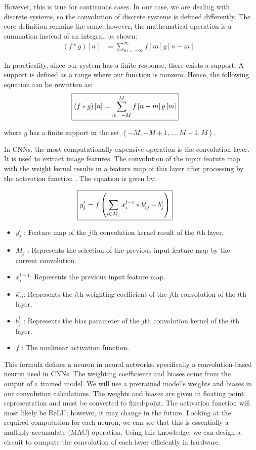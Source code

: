 \documentclass{article}
\begin{document}
However, this is true for continuous cases. In our case, we are dealing with discrete systems, so the convolution of discrete systems is defined differently. The core definition remains the same; however, the mathematical operation is a summation instead of an integral, as shown:
\begin{align*}
  \left( f * g \right) \left[ n \right] &= \sum_{m = -\infty}^{\infty} f \left[ m\right] g \left[ n-m \right]
\end{align*}

In practicality, since our system has a finite response, there exists a support. A support is defined as a range where our function is nonzero. Hence, the following equation can be rewritten as:
\begin{align*}
  \Aboxed{\left( f * g \right) \left[ n \right] &=  \sum_{m = -M }^{M} f \left[ n - m  \right]  g \left[ m \right]}
\end{align*}

where $g$ has a finite support in the set $ \left\{ -M, -M  + 1,  \dots, M-1, M \right\} $.

In CNNs, the most computationally expensive operation is the convolution layer. It is used to extract image features. The convolution of the input feature map with the weight kernel results in a feature map of this layer after processing by the activation function \cite{xiao_fpga_2020}. The equation is given by:

\begin{align*}
  \Aboxed{  y'_j = f \left( \sum_{i \in M_j}^{} x^{l-1}_{i}  * k^l_{ij} + b^l_{j}\right)}
\end{align*}

\begin{itemize}
  \item $ y^{l}_j $ : Feature map of the $ j $th convolution kernel result of the $ l  $th layer.
  \item $ M_{j} $ : Represents the selection of the previous input feature map by the current convolution.
  \item $ x_{i }^{l-1} $: Represents the previous input feature map.
  \item $ k_{ij}^l  $: Represents the $ i  $th weighting coefficient of the $ j  $th convolution of the $ l  $th layer.
  \item $ b^{l }_j $ : Represents the bias parameter of the $ j  $th convolution kernel of the $ l  $th layer.
  \item $ f $ : The nonlinear activation function.
\end{itemize}

This formula defines a neuron in neural networks, specifically a convolution-based neuron used in CNNs. The weighting coefficients and biases come from the output of a trained model. We will use a pretrained model's weights and biases in our convolution calculations. The weights and biases are given in floating point representation and must be converted to fixed-point. The activation function will most likely be ReLU; however, it may change in the future. Looking at the required computation for each neuron, we can see that this is essentially a multiply-accumulate (MAC) operation. Using this knowledge, we can design a circuit to compute the convolution of each layer efficiently in hardware.
\end{document}
